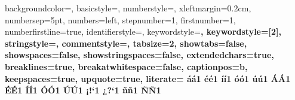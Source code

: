 


 {%
  backgroundcolor=\color{codeBakground},
  basicstyle=\small,
  numberstyle=\tiny\color{codeNumbers},
  xleftmargin={0.2cm},
  numbersep=5pt,
  numbers=left,
  stepnumber=1,
  firstnumber=1,
  numberfirstline=true,
  identifierstyle=\color{draculafg},
  keywordstyle=\color{blue}\bfseries,
  keywordstyle={[2]\color{blue}},
  stringstyle=\color{codeString}\ttfamily,
  commentstyle=\color{yellow}\ttfamily,
  tabsize=2,
  showtabs=false,
  showspaces=false,
  showstringspaces=false,
  extendedchars=true,
  breaklines=true,
  breakatwhitespace=false,
  captionpos=b,
  keepspaces=true,
  upquote=true,                      %
  literate=%
  {á}{{\'a}}1 {é}{{\'e}}1 {í}{{\'i}}1 {ó}{{\'o}}1 {ú}{{\'u}}1
  {Á}{{\'A}}1 {É}{{\'E}}1 {Í}{{\'I}}1 {Ó}{{\'O}}1 {Ú}{{\'U}}1
  {¡}{{!`}}1  {¿}{{?`}}1
  {ñ}{{\~n}}1 {Ñ}{{\~N}}1
}

\lstset{style=mystyle}

